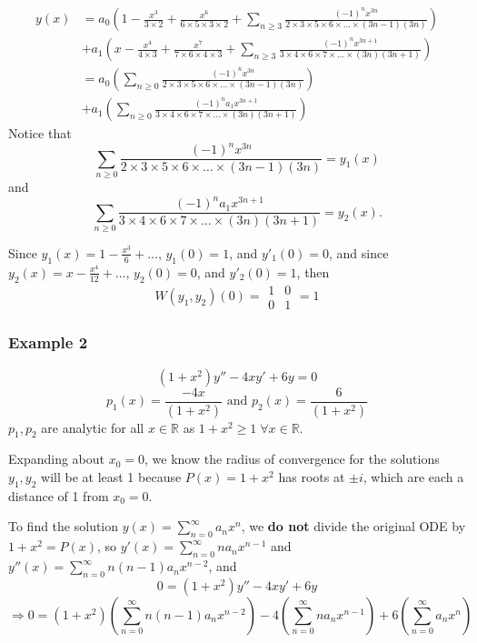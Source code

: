 \documentclass[11pt]{article}
\newcommand{\sumseries}{\sum_{n=0}^{\infty}}
\begin{document}
		\begin{align*}
			y(x) &= a_0 \left( 1 - \frac{x^3}{3\times2} + \frac{x^6}{6\times5\times3\times2} +  \sum_{n \geq 3} \frac{(-1)^n x^{3n}}{2 \times 3 \times 5 \times 6 \times \ldots \times (3n-1)(3n)} \right) \\
				&+ a_1 \left( x - \frac{x^4}{4 \times 3} + \frac{x^7}{7\times6\times4\times3} + \sum_{n\geq3} \frac{(-1)^n x^{3n+1}}{3 \times 4 \times 6 \times 7 \times \ldots \times (3n)(3n+1)} \right) \\
				&= a_0 \left( \sum_{n \geq 0} \frac{(-1)^n x^{3n}}{2 \times 3 \times 5 \times 6 \times \ldots \times (3n-1)(3n)} \right) \\
				&+ a_1 \left( \sum_{n\geq0} \frac{(-1)^n a_1 x^{3n+1}}{3 \times 4 \times 6 \times 7 \times \ldots \times (3n)(3n+1)} \right)
		\end{align*}
	Notice that
		$$ \sum_{n \geq 0} \frac{(-1)^n x^{3n}}{2 \times 3 \times 5 \times 6 \times \ldots \times (3n-1)(3n)} = y_1(x) $$
	and
		$$ \sum_{n\geq0} \frac{(-1)^n a_1 x^{3n+1}}{3 \times 4 \times 6 \times 7 \times \ldots \times (3n)(3n+1)} = y_2 (x). $$

	Since $y_1(x) = 1 - \frac{x^3}{6} + \ldots$, $y_1 (0) = 1$, and $y'_1 (0) = 0$, and since $y_2 (x) = x - \frac{x^4}{12} + \ldots$, $y_2 (0) = 0$, and $y'_2 (0) = 1$, then
		$$ W(y_1, y_2)(0) = \begin{array}{|cc|} 1 & 0 \\ 0 & 1 \end{array} = 1 $$

\subsubsection{Example 2}
		$$ (1 + x^2) y'' - 4xy' + 6y = 0 $$
		$$ p_1 (x) = \frac{-4x}{(1+x^2)} \text{ and } p_2 (x) = \frac{6}{(1+x^2)} $$
	$p_1, p_2$ are analytic for all $x \in \mathbb{R}$ as $1+x^2 \geq 1 \; \forall x \in \mathbb{R}$.

	Expanding about $x_0 = 0$, we know the radius of convergence for the solutions $y_1, y_2$ will be at least 1 because $P(x) = 1+x^2$ has roots at $\pm i$, which are each a distance of 1 from $x_0 = 0$.

	To find the solution $y(x) = \sumseries a_n x^n$, we \textbf{do not} divide the original ODE by $1 + x^2 = P(x)$, so $y'(x) = \sumseries n a_n x^{n-1}$ and $y''(x) = \sumseries n (n-1) a_n x^{n-2}$, and
		$$ 0 = (1 + x^2) y'' - 4xy' + 6y $$
		$$ \Rightarrow 0 = (1+x^2) \left(\sumseries n (n-1) a_n x^{n-2}\right) - 4 \left(\sumseries n a_n x^{n-1}\right) + 6 \left(\sumseries a_n x^n\right) $$
\end{document}
